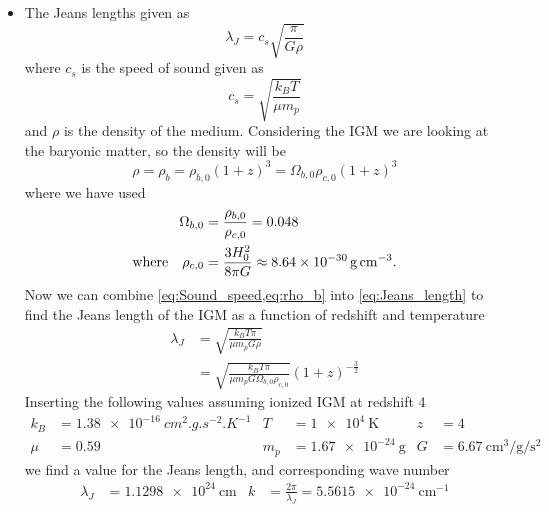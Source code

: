 \documentclass[11pt,a4paper]{article}
\begin{document}
\begin{itemize}
\item
The Jeans lengths given as
\begin{equation}
\lambda_J = c_s \sqrt{\frac{\pi}{G\rho}}
\label{eq:Jeans_length}
\end{equation}
where $c_s$ is the speed of sound given as
\begin{equation}
c_s = \sqrt{\frac{k_B T}{\mu m_p}}
\label{eq:Sound_speed}
\end{equation}
and $\rho$ is the density of the medium. Considering the IGM we are looking at the baryonic matter, so the density will be
\begin{equation}
\rho = \rho_b = \rho_{b,0}(1+z)^3 = \Omega_{b,0}\rho_{c,0}(1+z)^3
\label{eq:rho_b}
\end{equation}
where we have used
\begin{align*}
\Omega_{b,0} &= \frac{\rho_{b,0}}{\rho_{c,0}} = 0.048
\\
\qq*{where} \rho_{c,0} &= \frac{3H_0^2}{8\pi G} \approx \SI{8.64e-30}{g.cm^{-3}}.
\end{align*}
Now we can combine \cref{eq:Sound_speed,eq:rho_b} into \cref{eq:Jeans_length} to find the Jeans length of the IGM as a function of redshift and temperature
\begin{align*}
\lambda_J &= \sqrt{\frac{k_BT\pi}{\mu m_p G \rho}}
\\
&= \sqrt{ \frac{k_B T\pi}{\mu m_p G \Omega_{b,0} \rho_{c,0} }}(1+z)^{-\frac{3}{2}}
\end{align*}
Inserting the following values assuming ionized IGM at redshift 4
\begin{align*}
k_B &= \SI{1.38e-16}{cm^2.g.s^{-2}.K^{-1}} & T &= \SI{1e4}{\kelvin} & z&=4
\\
\mu &= 0.59 & m_p &= \SI{1.67e-24}{\gram} & G&= \SI{6.67}{\cubic\cm\per\gram\per\square\second}
\end{align*}
we find a value for the Jeans length, and corresponding wave number
\begin{align*}
\lambda_J &= \SI{1.1298e24}{\cm} & k &= \frac{2\pi}{\lambda_J} = \SI{5.5615e-24}{\cm^{-1}}
\end{align*}


\end{itemize}
\end{document}
